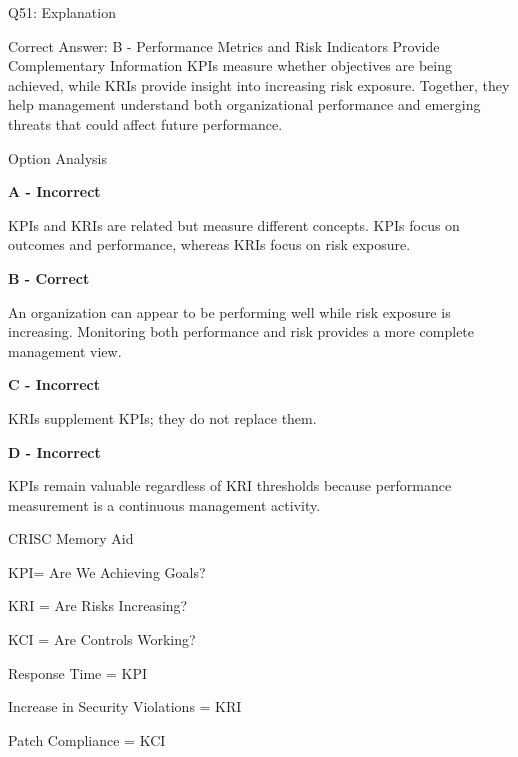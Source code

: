 \documentclass{beamer}
\begin{document}
	\begin{frame}[shrink=10]{Q51: Explanation}
		\footnotesize
		
		\begin{block}{Correct Answer: B - Performance Metrics and Risk Indicators Provide Complementary Information}
			KPIs measure whether objectives are being achieved, while
			KRIs provide insight into increasing risk exposure. Together,
			they help management understand both organizational performance
			and emerging threats that could affect future performance.
		\end{block}
		
		\begin{block}{Option Analysis}
			
			\textbf{A - Incorrect}
			
			KPIs and KRIs are related but measure different concepts.
			KPIs focus on outcomes and performance, whereas KRIs focus
			on risk exposure.
			
			\vspace{0.15cm}
			
			\textbf{B - Correct}
			
			An organization can appear to be performing well while risk
			exposure is increasing. Monitoring both performance and risk
			provides a more complete management view.
			
			\vspace{0.15cm}
			
			\textbf{C - Incorrect}
			
			KRIs supplement KPIs; they do not replace them.
			
			\vspace{0.15cm}
			
			\textbf{D - Incorrect}
			
			KPIs remain valuable regardless of KRI thresholds because
			performance measurement is a continuous management activity.
			
		\end{block}
		
		\begin{block}{CRISC Memory Aid}
			
			KPI= Are We Achieving Goals?
			
			\vspace{0.1cm}
			
			KRI			= Are Risks Increasing?
			
			\vspace{0.1cm}
			
			KCI			= Are Controls Working?
			
			\vspace{0.15cm}
			
			Response Time			= KPI
			
			\vspace{0.1cm}
			
			Increase in Security Violations			= KRI
			
			\vspace{0.1cm}
			
			Patch Compliance			= KCI
			
		\end{block}
		
	\end{frame}
	
\end{document}
